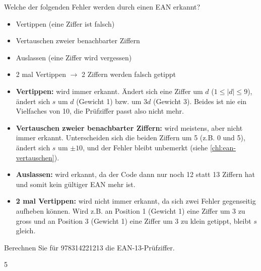 \begin{myexercise}
    Welche der folgenden Fehler werden durch einen \gls{EAN} erkannt?
    \begin{itemize}
        \item Vertippen (eine Ziffer ist falsch)
        \item Vertauschen zweier benachbarter Ziffern
        \item Auslassen (eine Ziffer wird vergessen)
        \item 2 mal Vertippen $\rightarrow$ 2 Ziffern werden falsch getippt
    \end{itemize}
    \begin{myanswer}
        \begin{itemize}
            \item \textbf{Vertippen:} wird immer erkannt. Ändert sich eine Ziffer um $d$ ($1 \leq |d| \leq 9$), ändert sich $s$ um $d$ (Gewicht 1) bzw. um $3d$ (Gewicht 3). Beides ist nie ein Vielfaches von 10, die Prüfziffer passt also nicht mehr.
            \item \textbf{Vertauschen zweier benachbarter Ziffern:} wird meistens, aber nicht immer erkannt. Unterscheiden sich die beiden Ziffern um 5 (z.B. 0 und 5), ändert sich $s$ um $\pm 10$, und der Fehler bleibt unbemerkt (siehe \cref{chl:ean-vertauschen}).
            \item \textbf{Auslassen:} wird erkannt, da der Code dann nur noch 12 statt 13 Ziffern hat und somit kein gültiger \gls{EAN} mehr ist.
            \item \textbf{2 mal Vertippen:} wird nicht immer erkannt, da sich zwei Fehler gegenseitig aufheben können. Wird z.B. an Position 1 (Gewicht 1) eine Ziffer um 3 zu gross und an Position 3 (Gewicht 1) eine Ziffer um 3 zu klein getippt, bleibt $s$ gleich.
        \end{itemize}
    \end{myanswer}
\end{myexercise}

\begin{myexercise}
    Berechnen Sie für 978314221213 die \acrshort{EAN}-13-Prüfziffer.
    \begin{myanswer}
        5
    \end{myanswer}
\end{myexercise}


